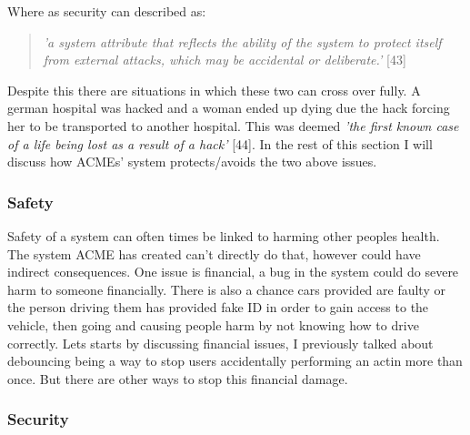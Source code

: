   Where as security can described as:
  \begin{quote}
    \textit{'a system attribute that reflects the ability of the system to protect itself from external attacks, which may be accidental or deliberate.'} [43]
  \end{quote}

  Despite this there are situations in which these two can cross over fully. A german hospital was hacked and a woman ended up dying due the hack forcing her 
  to be transported to another hospital. This was deemed \textit{'the first known case of a life being lost as a result of a hack'} [44].
  In the rest of this section I will discuss how ACMEs' system protects/avoids the two above issues.

  \subsubsection{Safety}
  Safety of a system can often times be linked to harming other peoples health. The system ACME has created can't directly do that, however could have 
  indirect consequences. One issue is financial, a bug in the system could do severe harm to someone financially. There is also a chance cars provided 
  are faulty or the person driving them has provided fake ID in order to gain access to the vehicle, then going and causing people harm by not knowing 
  how to drive correctly.
  Lets starts by discussing financial issues, I previously talked about debouncing being a way to stop users accidentally performing an actin more than
  once. But there are other ways to stop this financial damage.

  \subsubsection{Security}

\newpage
